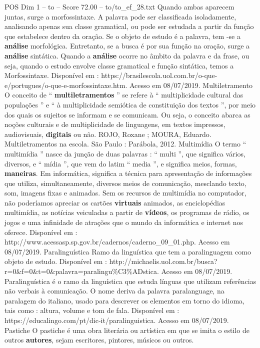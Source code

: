 \begin{textsample}{POS Dim 1 – to – Score 72.00 – to/to\_ef\_28.txt}
Quando ambas aparecem juntas, surge a morfossintaxe.
A palavra pode ser classificada isoladamente, analisando apenas sua classe gramatical, ou pode ser estudada a partir da função que estabelece dentro da oração.
Se o objeto de estudo é a palavra, tem -se a \textbf{análise} morfológica.
Entretanto, se a busca é por sua função na oração, surge a \textbf{análise} sintática.
Quando a \textbf{análise} ocorre no âmbito da palavra e da frase, ou seja, quando o estudo envolve classe gramatical e função sintática, temos a Morfossintaxe.
Disponível em : https://brasilescola.uol.com.br/o-que-e/portugues/o-que-e-morfossintaxe.htm.
Acesso em 08/07/2019.
Multiletramento O conceito de “ \textbf{multiletramentos} ” se refere à “ multiplicidade cultural das populações ” e “ à multiplicidade semiótica de constituição dos textos ”, por meio dos quais os sujeitos se informam e se comunicam.
Ou seja, o conceito abarca as noções culturais e de multiplicidade de linguagens, em textos impressos, audiovisuais, \textbf{digitais} ou não.
ROJO, Roxane ; MOURA, Eduardo.
Multiletramentos na escola.
São Paulo : Parábola, 2012.
Multimídia O termo “ multimídia ” nasce da junção de duas palavras : “ multi ”, que significa vários, diversos, e “ mídia ”, que vem do latim “ media ”, e significa meios, formas, \textbf{maneiras}.
Em informática, significa a técnica para apresentação de informações que utiliza, simultaneamente, diversos meios de comunicação, mesclando texto, som, imagens fixas e animadas.
Sem os recursos de multimídia no computador, não poderíamos apreciar os cartões \textbf{virtuais} animados, as enciclopédias multimídia, as notícias veiculadas a partir de \textbf{vídeos}, os programas de rádio, os jogos e uma infinidade de atrações que o mundo da informática e internet nos oferece.
Disponível em : http://www.acessasp.sp.gov.br/cadernos/caderno\_09\_01.php.
Acesso em 08/07/2019.
Paralinguística Ramo da linguística que tem a paralinguagem como objeto de estudo.
Disponível em : http://michaelis.uol.com.br/busca? r=0\&f=0\&t=0\&palavra=paralingu\%C3\%ADstica.
Acesso em 08/07/2019.
Paralinguística é o ramo da linguística que estuda línguas que utilizam referências não verbais à comunicação.
O nome deriva da palavra paralanguage, na paralagem do italiano, usado para descrever os elementos em torno do idioma, tais como : altura, volume e tom de fala.
Disponível em : https://educalingo.com/pt/dic-it/paralinguistica.
Acesso em 08/07/2019.
Pastiche O pastiche é uma obra literária ou artística em que se imita o estilo de outros \textbf{autores}, sejam escritores, pintores, músicos ou outros.

\end{textsample}
